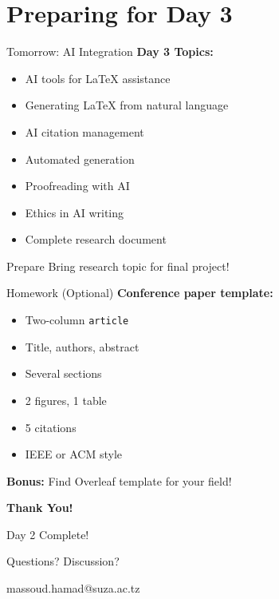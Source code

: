 \documentclass[aspectratio=169]{beamer}
\begin{document}
	\section{Preparing for Day 3}
	
	\begin{frame}{Tomorrow: AI Integration}
		\textbf{Day 3 Topics:}
		\begin{itemize}
			\item AI tools for LaTeX assistance
			\item Generating LaTeX from natural language
			\item AI citation management
			\item Automated generation
			\item Proofreading with AI
			\item Ethics in AI writing
			\item Complete research document
		\end{itemize}
		
		\vspace{1em}
		
		\begin{exampleblock}{Prepare}
			Bring research topic for final project!
		\end{exampleblock}
	\end{frame}
	
	\begin{frame}{Homework (Optional)}
		\textbf{Conference paper template:}
		\begin{itemize}
			\item Two-column \texttt{article}
			\item Title, authors, abstract
			\item Several sections
			\item 2 figures, 1 table
			\item 5 citations
			\item IEEE or ACM style
		\end{itemize}
		
		\vspace{1em}
		
		\textbf{Bonus:}
		Find Overleaf template for your field!
	\end{frame}
	
	\begin{frame}
		\begin{center}
			\Huge\textbf{Thank You!}
			
			\vspace{2em}
			
			\Large Day 2 Complete!
			
			\vspace{1em}
			
			\normalsize
			Questions? Discussion?
			
			\vspace{1em}
			
			massoud.hamad@suza.ac.tz
		\end{center}
	\end{frame}
	
\end{document}
